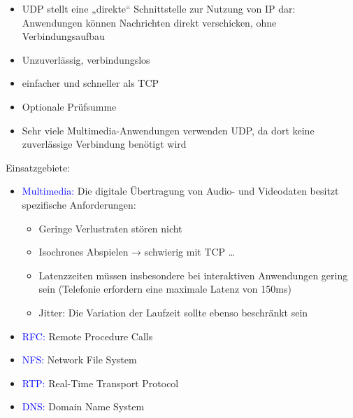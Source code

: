 
\begin{itemize}
    \item UDP stellt eine „direkte“ Schnittstelle zur Nutzung von IP dar: Anwendungen können Nachrichten direkt verschicken, ohne Verbindungsaufbau
    \item Unzuverlässig, verbindungslos
    \item einfacher und schneller als TCP
    \item Optionale Prüfsumme
    \item Sehr viele Multimedia-Anwendungen verwenden UDP, da dort keine zuverlässige Verbindung benötigt wird
\end{itemize}
Einsatzgebiete:
\begin{itemize}
    \item \textcolor{blue}{Multimedia:} Die digitale Übertragung von Audio- und Videodaten besitzt spezifische Anforderungen:
    \begin{itemize}
        \item Geringe Verlustraten stören nicht
        \item Isochrones Abspielen → schwierig mit TCP \ldots
        \item Latenzzeiten müssen insbesondere bei interaktiven Anwendungen gering sein (Telefonie erfordern eine maximale Latenz von 150ms)
        \item Jitter: Die Variation der Laufzeit sollte ebenso beschränkt sein
    \end{itemize}
    \item \textcolor{blue}{RFC:} Remote Procedure Calls
    \item \textcolor{blue}{NFS:} Network File System
    \item \textcolor{blue}{RTP:} Real-Time Transport Protocol
    \item \textcolor{blue}{DNS:} Domain Name System
\end{itemize}

